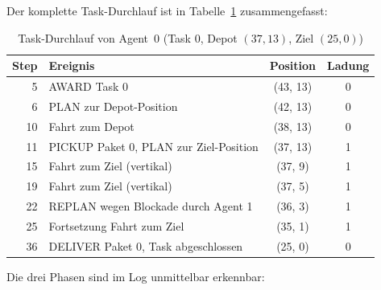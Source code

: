 

Der komplette Task-Durchlauf ist in Tabelle~\ref{tab:agent_3c} zusammengefasst:

\begin{table}[H]
    \centering
    \begin{tabular}{r l c c}
        \toprule
        \textbf{Step} & \textbf{Ereignis} & \textbf{Position} & \textbf{Ladung} \\
        \midrule
        5  & AWARD Task 0                            & (43, 13) & 0 \\
        6  & PLAN zur Depot-Position                 & (42, 13) & 0 \\
        10 & Fahrt zum Depot                         & (38, 13) & 0 \\
        11 & PICKUP Paket 0, PLAN zur Ziel-Position  & (37, 13) & 1 \\
        15 & Fahrt zum Ziel (vertikal)               & (37, 9)  & 1 \\
        19 & Fahrt zum Ziel (vertikal)               & (37, 5)  & 1 \\
        22 & REPLAN wegen Blockade durch Agent 1     & (36, 3)  & 1 \\
        25 & Fortsetzung Fahrt zum Ziel              & (35, 1)  & 1 \\
        36 & DELIVER Paket 0, Task abgeschlossen     & (25, 0)  & 0 \\
        \bottomrule
    \end{tabular}
    \caption{Task-Durchlauf von Agent~0 (Task 0, Depot $(37,13)$, Ziel $(25,0)$)}
    \label{tab:agent_3c}
\end{table}

Die drei Phasen sind im Log unmittelbar erkennbar:

